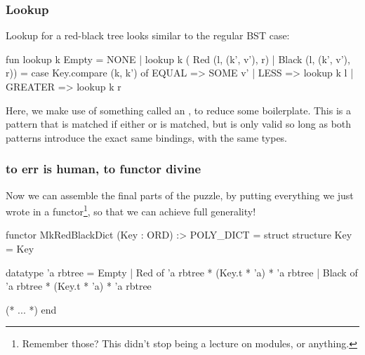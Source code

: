 \documentclass[aspectratio=169, handout]{beamer}
\begin{document}
\begin{frame}[fragile]
  \frametitle{Lookup}

  Lookup for a red-black tree looks similar to the regular BST case:

  \pause
  \vspace{\fill}

  \begin{codeblock}
    fun lookup k Empty = NONE
      | lookup k ( Red (l, (k', v'), r)
                 | Black (l, (k', v'), r)) =
          case Key.compare (k, k') of
            EQUAL   => SOME v'
          | LESS    => lookup k l
          | GREATER => lookup k r
  \end{codeblock}

  \pause
  \vspace{\fill}

  Here, we make use of something called an , to
  reduce some boilerplate. This is a pattern 
  that is matched if either  or  is matched, but
  is only valid so long as both patterns introduce the exact same bindings,
  with the same types.
\end{frame}

\begin{frame}[fragile]
  \frametitle{to err is human, to functor divine}

  Now we can assemble the final parts of the puzzle, by putting everything
  we just wrote in a functor\footnote{
    Remember those? This didn't stop being a lecture on modules,
    or anything.
  }, so that we can achieve full generality!

  \pause
  \vspace{\fill}

  \begin{codeblock}
    functor MkRedBlackDict (Key : ORD) :> POLY_DICT =
      struct
        structure Key = Key

        datatype 'a rbtree =
            Empty
          | Red of 'a rbtree * (Key.t * 'a) * 'a rbtree
          | Black of 'a rbtree * (Key.t * 'a) * 'a rbtree

        (* ... *)
      end
  \end{codeblock}
\end{frame}
\end{document}
